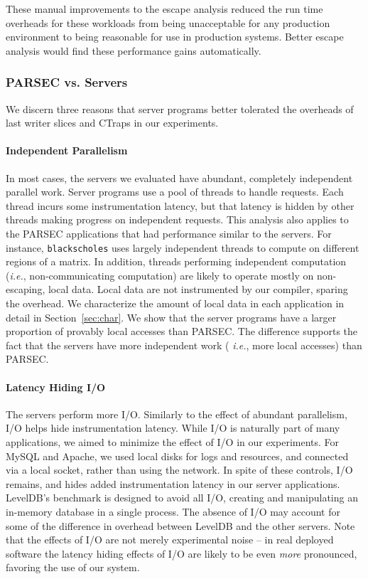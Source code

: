 \documentclass[preprint,9pt]{sigplanconf}
\newcommand{\ctraps}{CTraps\xspace}
\begin{document}
These manual improvements to the escape analysis reduced the run time overheads
for these workloads from being unacceptable for any production environment to
being reasonable for use in production systems. Better escape analysis would
find these performance gains automatically.


\subsubsection{PARSEC vs. Servers}
\label{sec:eval:parsecserver}
We discern three reasons that server programs better tolerated the overheads of
last writer slices and \ctraps in our experiments.

\paragraph{Independent Parallelism}
In most cases, the servers we evaluated have abundant, completely independent
parallel work.  Server programs use a pool of threads to handle requests.
Each thread incurs some instrumentation latency, but that latency is hidden by
other threads making progress on independent requests.  This analysis also
applies to the PARSEC applications that had performance similar to the servers.
For instance, {\tt blackscholes} uses largely independent threads to compute on
different regions of a matrix.  In addition, threads performing independent
computation ({\em i.e.}, non-communicating computation) are likely to operate
mostly on non-escaping, local data.  Local data are not instrumented by our
compiler, sparing the overhead.  We characterize the amount of local data in
each application in detail in Section~\ref{sec:char}.  We show that the server
programs have a larger proportion of provably local accesses than PARSEC.  The
difference supports the fact that the servers have more independent work ({\em
i.e.}, more local accesses) than PARSEC. 


\paragraph{Latency Hiding I/O}
The servers perform more I/O.  Similarly to the effect of abundant parallelism,
I/O helps hide instrumentation latency.  While I/O is naturally part of many
applications, we aimed to minimize the effect of I/O in our experiments.  For
MySQL and Apache, we used local disks for logs and resources, and connected via
a local socket, rather than using the network.  In spite of these controls, I/O
remains, and hides added instrumentation latency in our server applications.
LevelDB's benchmark is designed to avoid all I/O, creating and manipulating an
in-memory database in a single process.  The absence of I/O may account for some
of the difference in overhead between LevelDB and the other servers.  Note that
the effects of I/O are not merely experimental noise -- in real deployed
software the latency hiding effects of I/O are likely to be even {\em more}
pronounced, favoring the use of our system.
\end{document}
